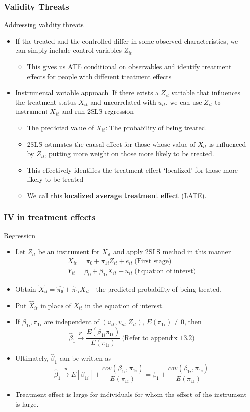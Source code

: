 \documentclass[compress]{beamer}
\begin{document}
\begin{frame}
\frametitle{Validity Threats}
Addressing validity threats
\begin{itemize}
\item If the treated and the controlled differ in some observed characteristics, we can simply include control variables $Z_{it}$
\begin{itemize}
\item This gives us ATE conditional on observables and identify treatment effects for people with different treatment effects
\end{itemize}
\item Instrumental variable approach: If there exists a $Z_{it}$ variable that influences the treatment status $X_{it}$ and uncorrelated with $u_{it}$, we can use $Z_{it}$ to instrument $X_{it}$ and run 2SLS regression
\begin{itemize}
\item The predicted value of $X_{it}$: The probability of being treated. 
\item 2SLS estimates the causal effect for those whose value of $X_{it}$ is influenced by $Z_{it}$, putting more weight on those more likely to be treated.
\item This effectively identifies the treatment effect `localized' for those more likely to be treated
\item We call this \textbf{localized average treatment effect} (LATE).
\end{itemize}
\end{itemize}
\end{frame}

\begin{frame}
\frametitle{IV in treatment effects}
Regression
\begin{itemize}
\item Let $Z_{it}$ be an instrument for $X_{it}$ and apply 2SLS method in this manner
\begin{gather*}
X_{it} = \pi_0+\pi_{1i}Z_{it}+e_{it} \ \text{(First stage)}\\
Y_{it} = \beta_0+\beta_{1i}X_{it}+u_{it} \ \text{(Equation of interst)}
\end{gather*}
\item Obtain $\hat{X}_{it}=\hat{\pi_0}+\hat{\pi}_{1i}X_{it}$ - the predicted probability of being treated. 
\item Put $\hat{X}_{it}$ in place of $X_{it}$ in the equation of interest. 
\item If $\beta_{1i}, \pi_{1i}$ are independent of $(u_{it},v_{it}, Z_{it})$, $E(\pi_{1i})\neq0$, then
\[
\hat{\beta}_{1}\xrightarrow{p}\frac{E(\beta_{1i}\pi_{1i})}{E(\pi_{1i})} \ \text{(Refer to appendix 13.2)}
\]
\item Ultimately, $\hat{\beta}_1$ can be written as 
\[
\hat{\beta}_{1}\xrightarrow{p} E[\beta_{1i}]+\frac{cov(\beta_{1i},\pi_{1i})}{E(\pi_{1i})} = \beta_1+\frac{cov(\beta_{1i},\pi_{1i})}{E(\pi_{1i})}
\]
\item Treatment effect is large for individuals for whom the effect of the instrument is large.
\end{itemize}
\end{frame}
\end{document}

